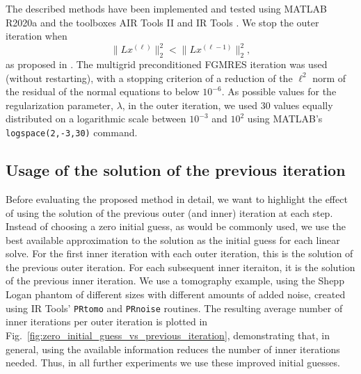The described methods have been implemented and tested using MATLAB R2020a and the toolboxes AIR Tools II \cite{art:HANS18} and IR Tools \cite{art:GAZZ19}. We stop the outer iteration when
\[
\|L x^{(\ell)}\|_2^2 < \|L x^{(\ell-1)}\|_2^2,
\]
as proposed in \cite{Gazzola_etal_2020}. The multigrid preconditioned
FGMRES iteration was used (without restarting), with a stopping
criterion of a reduction of the $\ell^2$ norm of the residual of the normal equations to below $10^{-6}$. As possible values for the regularization parameter, $\lambda$, in the outer iteration, we used 30 values equally distributed on a logarithmic scale between $10^{-3}$ and $10^{2}$ using MATLAB's \texttt{logspace(2,-3,30)} command.

\subsection{Usage of the solution of the previous iteration}
Before evaluating the proposed method in detail, we want to highlight the effect of using the solution of the previous outer (and inner) iteration at each step. Instead of choosing a zero initial guess, as would be commonly used, we use the best available approximation to the solution as the initial guess for each linear solve.  For the first inner iteration with each outer iteration, this is the solution of the previous outer iteration.  For each subsequent inner iteraiton, it is the solution of the previous inner iteration.  We use a tomography example, using the Shepp Logan phantom of different sizes with different amounts of added noise, created using IR Tools' \cite{art:GAZZ19} \texttt{PRtomo} and \texttt{PRnoise} routines. The resulting average number of inner iterations per outer iteration is plotted in Fig.~\ref{fig:zero_initial_guess_vs_previous_iteration}, demonstrating that, in general, using the available information reduces the number of inner iterations needed.  Thus, in all further experiments we use these improved initial guesses.
